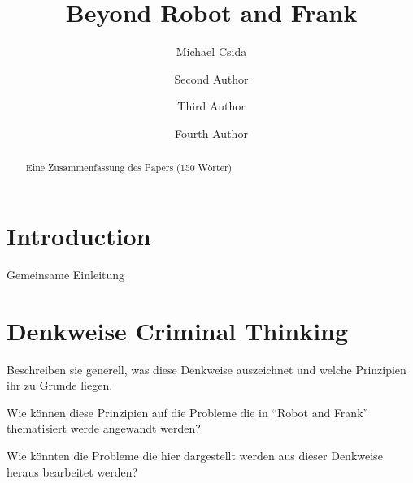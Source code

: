 \documentclass[sigchi-a, authorversion]{acmart}
\begin{document}
\title{Beyond Robot and Frank}

\author{Michael Csida}

\author{Second Author}

\author{Third Author}

\author{Fourth Author}

\renewcommand{\shortauthors}{F. Author et al.}

\maketitle

\begin{abstract}
    Eine Zusammenfassung des Papers (150 Wörter)

\end{abstract}

\section{Introduction}

Gemeinsame Einleitung



\section{Denkweise Criminal Thinking}

Beschreiben sie generell, was diese Denkweise auszeichnet und welche Prinzipien ihr zu Grunde liegen.

Wie können diese Prinzipien auf die Probleme die in ``Robot and Frank'' thematisiert werde angewandt werden?

Wie könnten die Probleme die hier dargestellt werden aus dieser Denkweise heraus bearbeitet werden?

\end{document}
